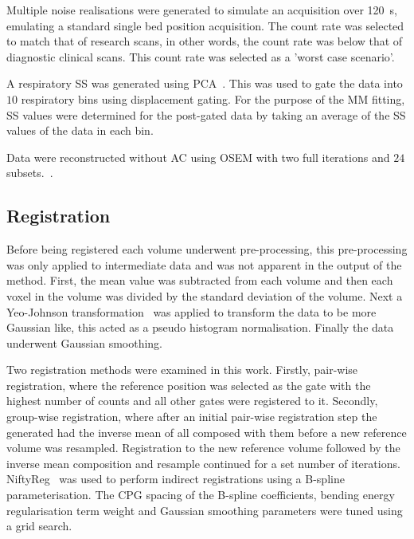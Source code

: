         Multiple noise realisations were generated to simulate an acquisition over \SI{120}{\second}, emulating a standard single bed position acquisition. The count rate was selected to match that of research scans, in other words, the count rate was below that of diagnostic clinical scans. This count rate was selected as a 'worst case scenario'.
        
        A respiratory \gls{SS} was generated using \gls{PCA}~\cite{Thielemans2011}. This was used to gate the data into $10$ respiratory bins using displacement gating. For the purpose of the \gls{MM} fitting, \gls{SS} values were determined for the post-gated data by taking an average of the \gls{SS} values of the data in each bin.
        
        Data were reconstructed without \gls{AC} using OSEM with two full iterations and $24$ subsets.~\cite{Hudson1994}.
    
    \vspace{-0.4cm}
    
    \subsection{Registration} \label{sec:registration}
        Before being registered each volume underwent pre-processing, this pre-processing was only applied to intermediate data and was not apparent in the output of the method. First, the mean value was subtracted from each volume and then each voxel in the volume was divided by the standard deviation of the volume. Next a Yeo-Johnson transformation~\cite{Johnson2013} was applied to transform the data to be more Gaussian like, this acted as a pseudo histogram normalisation. Finally the data underwent Gaussian smoothing.
        
        Two registration methods were examined in this work. Firstly, pair-wise registration, where the reference position was selected as the gate with the highest number of counts and all other gates were registered to it. Secondly, group-wise registration, where after an initial pair-wise registration step the  generated had the inverse mean of all  composed with them before a new reference volume was resampled. Registration to the new reference volume followed by the inverse mean composition and resample continued for a set number of iterations. NiftyReg~\cite{Modat2010} was used to perform indirect registrations using a B-spline parameterisation. The \gls{CPG} spacing of the B-spline coefficients, bending energy regularisation term weight and Gaussian smoothing parameters were tuned using a grid search.
    
